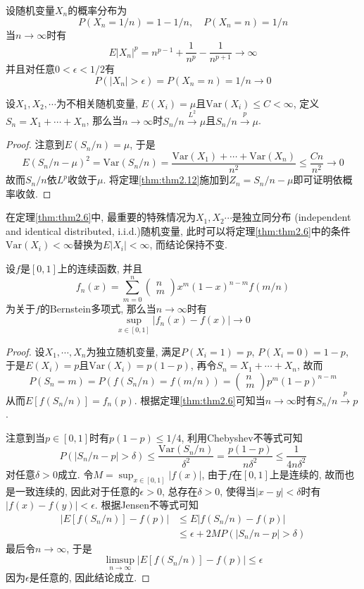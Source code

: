 \documentclass[cn, 12pt, math=mtpro2, bibstyle=apa, blue, twocol]{elegantbook}
\begin{document}
\begin{example}[依概率收敛但不依$L^p$收敛]
设随机变量$X_n$的概率分布为
$$P(X_n=1/n)=1-1/n,\quad P(X_n=n)=1/n$$
当$n\to\infty$时有
$$E|X_n|^p=n^{p-1}+\frac{1}{n^p}-\frac{1}{n^{p+1}}\to\infty$$
并且对任意$0<\epsilon<1/2$有
$$P(|X_n|>\epsilon)=P(X_n=n)=1/n\to 0$$
\end{example}

\begin{theorem}[$L^2$弱定律]\label{thm:thm2.6}
  设$X_1,X_2,\cdots$为不相关随机变量, $E(X_i)=\mu$且$\text{Var}(X_i)\leq C<\infty$, 定义$S_n=X_1+\cdots+X_n$, 那么当$n\to\infty$时$S_n/n\xrightarrow{L^2}\mu$且$S_n/n\xrightarrow{p}\mu$.
\end{theorem}
\begin{proof}
  注意到$E(S_n/n)=\mu$, 于是
  $$E(S_n/n-\mu)^2=\text{Var}(S_n/n)=\frac{\text{Var}(X_1)+\cdots+\text{Var}(X_n)}{n^2}\leq \frac{Cn}{n^2}\to0$$
  故而$S_n/n$依$L^p$收敛于$\mu$. 将定理\ref{thm:thm2.12}施加到$Z_n=S_n/n-\mu$即可证明依概率收敛.
\end{proof}


在定理\ref{thm:thm2.6}中, 最重要的特殊情况为$X_1,X_2\cdots$是独立同分布 (independent and identical distributed, i.i.d.)随机变量, 此时可以将定理\ref{thm:thm2.6}中的条件$\text{Var}(X_i)<\infty$替换为$E|X_i|<\infty$, 而结论保持不变.
\begin{example}[多项式逼近]
设$f$是$[0,1]$上的连续函数, 并且
$$f_n(x)=\sum_{m=0}^{n}\begin{pmatrix}
                        n \\
                        m
                      \end{pmatrix}x^m(1-x)^{n-m}f(m/n)$$
为关于$f$的Bernstein多项式, 那么当$n\to\infty$时有
$$\sup_{x\in[0,1]}|f_n(x)-f(x)|\to0$$
\end{example}
\begin{proof}
  设$X_1,\cdots,X_n$为独立随机变量, 满足$P(X_i=1)=p$, $P(X_i=0)=1-p$, 于是$E(X_i)=p$且$\text{Var}(X_i)=p(1-p)$, 再令$S_n=X_1+\cdots+X_n$, 故而
  $$P(S_n=m)=P(f(S_n/n)=f(m/n))=\begin{pmatrix}
                        n \\
                        m
                      \end{pmatrix}p^m(1-p)^{n-m}$$
  从而$E[f(S_n/n)]=f_n(p)$. 根据定理\ref{thm:thm2.6}可知当$n\to\infty$时有$S_n/n\xrightarrow{p} p$.

  注意到当$p\in[0,1]$时有$p(1-p)\leq 1/4$, 利用Chebyshev不等式可知
  $$P(|S_n/n-p|>\delta)\leq \frac{\text{Var}(S_n/n)}{\delta^2}=\frac{p(1-p)}{n\delta^2}\leq\frac{1}{4n\delta^2}$$
  对任意$\delta>0$成立. 令$M=\sup_{x\in[0,1]}|f(x)|$, 由于$f$在$[0,1]$上是连续的, 故而也是一致连续的, 因此对于任意的$\epsilon>0$, 总存在$\delta>0$, 使得当$|x-y|<\delta$时有$|f(x)-f(y)|<\epsilon$. 根据Jensen不等式可知
  \begin{align*}
  |E[f(S_n/n)]-f(p)|&\leq E|f(S_n/n)-f(p)| \\
  &\leq \epsilon+2MP(|S_n/n-p|>\delta)
  \end{align*}
  最后令$n\to\infty$, 于是
  $$\limsup_{n\to\infty}|E[f(S_n/n)]-f(p)|\leq\epsilon$$
  因为$\epsilon$是任意的, 因此结论成立.

\end{proof}
\end{document}
